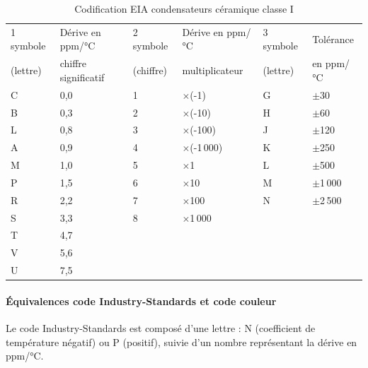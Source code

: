 \documentclass[a4paper]{article}
\begin{document}
\begin{table}[H]
	\centering
		\begin{tabular}{|l|l||l|l||l|l|}\hline
				1\ier{} symbole & Dérive en ppm/°C & 2\ieme{} symbole & Dérive en ppm/°C & 3\ieme{} symbole & Tolérance\\
				(lettre) & chiffre significatif & (chiffre) & multiplicateur & (lettre) & en ppm/°C\\\hline\hline
				C	& 0,0 & 1 & $\times$(-1) & G & $\pm$30\\\hline
				B	& 0,3 & 2 & $\times$(-10) & H & $\pm$60\\\hline
				L	& 0,8 & 3 & $\times$(-100) & J & $\pm$120\\\hline
				A & 0,9 & 4 & $\times$(-1\,000) & K & $\pm$250\\\hline
				M & 1,0 & 5 & $\times$1 & L & $\pm$500\\\hline
				P & 1,5 & 6 & $\times$10 & M & $\pm$1\,000\\\hline
				R & 2,2 & 7 & $\times$100 & N & $\pm$2\,500\\\hline
				S & 3,3 & 8 & $\times$1\,000 & & \\\hline
				T & 4,7 & & & & \\\hline
				V & 5,6 & & & & \\\hline
				U & 7,5 & & & & \\\hline
		\end{tabular}
	\caption{Codification \ac{EIA} condensateurs céramique classe I
		\label{Codification_EIA_condensateurs_céramique_classe_I}}
\end{table}

\paragraph{Équivalences code Industry-Standards et code couleur}

Le code Industry-Standards est composé d'une lettre : N (coefficient de température négatif) ou P (positif), suivie d'un nombre représentant la dérive en ppm/°C.
\end{document}

